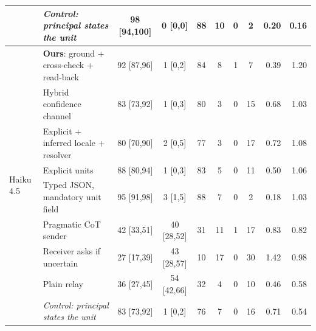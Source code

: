 \begin{tabular}{llcccccc rr}
 & \textit{Control: principal states the unit} & 98 [94,100] & 0 [0,0] & 88 & 10 & 0 & 2 & 0.20 & 0.16 \\
\midrule
\multirow{9}{*}{Haiku 4.5} & \textbf{Ours}: ground + cross-check + read-back & 92 [87,96] & 1 [0,2] & 84 & 8 & 1 & 7 & 0.39 & 1.20 \\
 & Hybrid confidence channel & 83 [73,92] & 1 [0,3] & 80 & 3 & 0 & 15 & 0.68 & 1.03 \\
 & Explicit + inferred locale + resolver & 80 [70,90] & 2 [0,5] & 77 & 3 & 0 & 17 & 0.72 & 1.08 \\
 & Explicit units \citep{miao2026capri} & 88 [80,94] & 1 [0,3] & 83 & 5 & 0 & 11 & 0.50 & 1.06 \\
 & Typed JSON, mandatory unit field & 95 [91,98] & 3 [1,5] & 88 & 7 & 0 & 2 & 0.18 & 1.03 \\
 & Pragmatic CoT sender \citep{miao2026capri} & 42 [33,51] & 40 [28,52] & 31 & 11 & 1 & 17 & 0.83 & 0.82 \\
 & Receiver asks if uncertain \citep{matsnev2026uncertainty} & 27 [17,39] & 43 [28,57] & 10 & 17 & 0 & 30 & 1.42 & 0.98 \\
 & Plain relay & 36 [27,45] & 54 [42,66] & 32 & 4 & 0 & 10 & 0.46 & 0.58 \\
 & \textit{Control: principal states the unit} & 83 [73,92] & 1 [0,2] & 76 & 7 & 0 & 16 & 0.71 & 0.54 \\
\bottomrule
\end{tabular}

